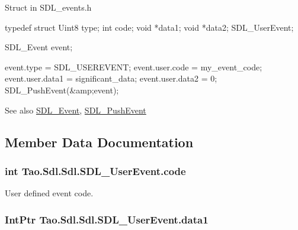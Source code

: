 Struct in SDL\_\-events.h 
\begin{DoxyCode}
            typedef struct{
                        Uint8 type;
                        int code;
                        void *data1;
                        void *data2;
                } SDL_UserEvent;
\end{DoxyCode}
 


\begin{DoxyCode}
            SDL_Event event;

                        event.type = SDL_USEREVENT;
                        event.user.code = my_event_code;
                        event.user.data1 = significant_data;
                        event.user.data2 = 0;
                        SDL_PushEvent(&amp;event);
\end{DoxyCode}


\begin{DoxySeeAlso}{See also}
\hyperlink{struct_tao_1_1_sdl_1_1_s_d_l___event}{SDL\_\-Event}, \hyperlink{_sdl_8cs_a521bf458cc5cfc65b822c2b5b8226646}{SDL\_\-PushEvent}


\end{DoxySeeAlso}


\subsection{Member Data Documentation}
\hypertarget{struct_tao_1_1_sdl_1_1_sdl_1_1_s_d_l___user_event_a84cc45701cf8751b178895e85d49bb08}{
\subsubsection[{code}]{\setlength{\rightskip}{0pt plus 5cm}int {\bf Tao.Sdl.Sdl.SDL\_\-UserEvent.code}}}
\label{struct_tao_1_1_sdl_1_1_sdl_1_1_s_d_l___user_event_a84cc45701cf8751b178895e85d49bb08}


User defined event code. 

\hypertarget{struct_tao_1_1_sdl_1_1_sdl_1_1_s_d_l___user_event_aa709beb1126baa571b3156f91f16b7bc}{
\subsubsection[{data1}]{\setlength{\rightskip}{0pt plus 5cm}IntPtr {\bf Tao.Sdl.Sdl.SDL\_\-UserEvent.data1}}}
\label{struct_tao_1_1_sdl_1_1_sdl_1_1_s_d_l___user_event_aa709beb1126baa571b3156f91f16b7bc}


